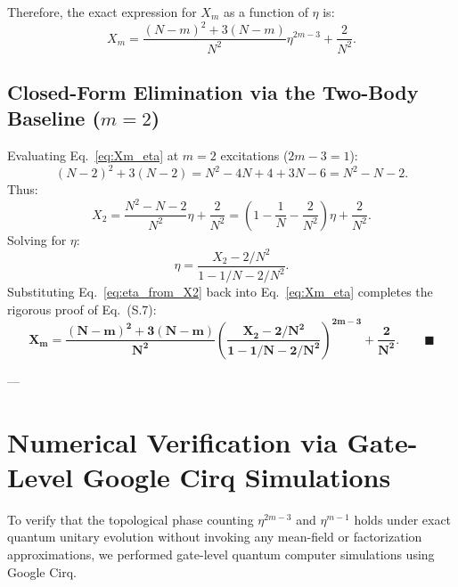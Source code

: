 \documentclass[11pt,a4paper]{article}
\begin{document}
Therefore, the exact expression for $X_m$ as a function of $\eta$ is:
\begin{equation}
    X_m = \frac{(N - m)^2 + 3(N - m)}{N^2} \eta^{2m - 3} + \frac{2}{N^2}.
    \label{eq:Xm_eta}
\end{equation}

\subsection{Closed-Form Elimination via the Two-Body Baseline ($m = 2$)}
Evaluating Eq.~\eqref{eq:Xm_eta} at $m = 2$ excitations ($2m - 3 = 1$):
\begin{equation}
    (N - 2)^2 + 3(N - 2) = N^2 - 4N + 4 + 3N - 6 = N^2 - N - 2.
\end{equation}
Thus:
\begin{equation}
    X_2 = \frac{N^2 - N - 2}{N^2} \eta + \frac{2}{N^2} = \left( 1 - \frac{1}{N} - \frac{2}{N^2} \right) \eta + \frac{2}{N^2}.
\end{equation}
Solving for $\eta$:
\begin{equation}
    \eta = \frac{X_2 - 2/N^2}{1 - 1/N - 2/N^2}.
    \label{eq:eta_from_X2}
\end{equation}
Substituting Eq.~\eqref{eq:eta_from_X2} back into Eq.~\eqref{eq:Xm_eta} completes the rigorous proof of Eq.~(S.7):
\begin{equation}
    \mathbf{X_m = \frac{(N - m)^2 + 3(N - m)}{N^2} \left( \frac{X_2 - 2/N^2}{1 - 1/N - 2/N^2} \right)^{2m - 3} + \frac{2}{N^2}.} \qquad \blacksquare
\end{equation}

---

\section{Numerical Verification via Gate-Level Google Cirq Simulations}

To verify that the topological phase counting $\eta^{2m - 3}$ and $\eta^{m - 1}$ holds under exact quantum unitary evolution without invoking any mean-field or factorization approximations, we performed gate-level quantum computer simulations using Google Cirq.
\end{document}
